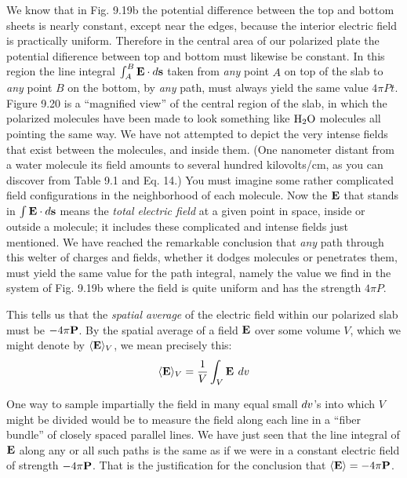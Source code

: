 We know that in Fig. 9.19b the potential difference between the
top and bottom sheets is nearly constant, except near the edges, because
the interior electric field is practically uniform. Therefore in
the central area of our polarized plate the potential difierence between
top and bottom must likewise be constant. In this region the
line integral $\int_A^B\mathbf{E}\cdot\mathop{d\!}\mathbf{s}$ taken from \emph{any} point $A$ on top of the slab to
\emph{any} point $B$ on the bottom, by \emph{any} path, must always yield the same
value $4\pi Pt$. Figure 9.20 is a ``magnified view'' of the central region
of the slab, in which the polarized molecules have been made to look
something like $\textup{H}_2\textup{O}$ molecules all pointing the same way. We have
not attempted to depict the very intense fields that exist between the
molecules, and inside them. (One nanometer distant from a water
molecule its field amounts to several hundred kilovolts/cm, as you
can discover from Table 9.1 and Eq. 14.) You must imagine some
rather complicated field configurations in the neighborhood of each
molecule. Now the $\mathbf{E}$ that stands in $\int\mathbf{E}\cdot\mathop{d\!}\mathbf{s}$ means the \emph{total electric
field} at a given point in space, inside or outside a molecule; it includes
these complicated and intense fields just mentioned. We
have reached the remarkable conclusion that \emph{any} path through this
welter of charges and fields, whether it dodges molecules or penetrates
them, must yield the same value for the path integral, namely
the value we find in the system of Fig. 9.19b where the field is quite
uniform and has the strength $4\pi P$.

This tells us that the \emph{spatial average} of the electric field within our
polarized slab must be $-4\pi\mathbf{P}$. By the spatial average of a field $\mathbf{E}$
over some volume $V$, which we might denote by $\langle\mathbf{E}\rangle_V$, we mean
precisely this:
\begin{equation}
  \langle\mathbf{E}\rangle_V = \frac{1}{V}\int_V \mathbf{E}\:\mathop{d\!} v
\end{equation}

One way to sample impartially the field in many equal small $\mathop{d\!} v$'s
into which $V$ might be divided would be to measure the field along
each line in a ``fiber bundle'' of closely spaced parallel lines. We
have just seen that the line integral of $\mathbf{E}$ along any or all such paths
is the same as if we were in a constant electric field of strength $-4\pi\mathbf{P}$.
That is the justification for the conclusion that $\langle\mathbf{E}\rangle=-4\pi\mathbf{P}$.

